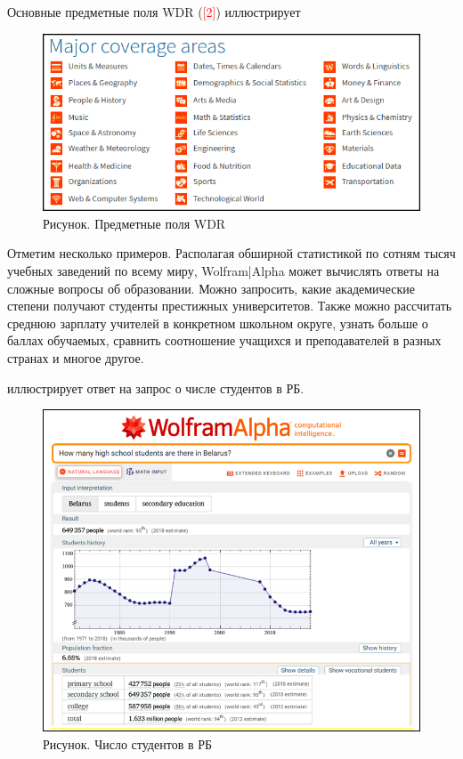 Основные предметные поля WDR (\textcolor{red}{[2]}) иллюстрирует \textit{} 
\begin{figure}[H]
	\centering
	\includegraphics[scale=0.9]{images/part7/chapter_integration/integr_alg1.png}
	\caption{Рисунок. Предметные поля WDR}
	\label{fig:integr_alg1}
\end{figure}


Отметим несколько примеров. Располагая обширной статистикой по сотням тысяч учебных заведений по всему миру, Wolfram|Alpha может вычислять ответы на сложные вопросы об образовании.
Можно запросить, какие академические степени получают студенты престижных университетов. 
Также можно рассчитать среднюю зарплату учителей в конкретном школьном округе, узнать больше о баллах обучаемых, сравнить соотношение учащихся и преподавателей в разных странах и многое другое.

\textit{} иллюстрирует ответ на запрос о числе студентов в РБ. 
\begin{figure}[H]
	\centering
	\includegraphics[scale=0.7]{images/part7/chapter_integration/integr_alg2.png}
	\caption{Рисунок. Число студентов в РБ}
	\label{fig:integr_alg2}
\end{figure}

